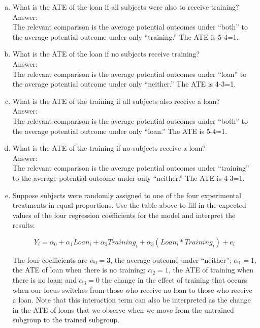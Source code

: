 \documentclass[11pt,notitlepage]{article}\usepackage[]{graphicx}\usepackage[]{color}
\begin{document}
\begin{enumerate}[a)]
\item What is the ATE of the loan if all subjects were also to receive training?\\
Answer:\\
The relevant comparison is the average potential outcomes under ``both'' to the average potential outcome under only ``training.''  The ATE is 5-4=1.

\item What is the ATE of the loan if no subjects receive training?\\
Answer:\\
The relevant comparison is the average potential outcomes under ``loan'' to the average potential outcome under only ``neither.''  The ATE is 4-3=1.

\item What is the ATE of the training if all subjects also receive a loan?\\
Answer:\\
The relevant comparison is the average potential outcomes under ``both'' to the average potential outcome under only ``loan.''  The ATE is 5-4=1.

\item What is the ATE of the training if no subjects receive a loan?\\
Answer:\\
The relevant comparison is the average potential outcomes under ``training'' to the average potential outcome under only ``neither.''  The ATE is 4-3=1.

\item Suppose subjects were randomly assigned to one of the four experimental treatments in equal proportions. Use the table above to fill in the expected values of the four regression coefficients for the model and interpret the results:

\begin{equation}
Y_i = \alpha_0 + \alpha_1 Loan_i + \alpha_2 Training_i + \alpha_3 (Loan_i * Training_i) + e_i
\end{equation}

The four coefficients are $\alpha_0=3$, the average outcome under ``neither''; $\alpha_1=1$, the ATE of loan when there is no training; $\alpha_2=1$, the ATE of training when there is no loan; and $\alpha_3=0$ the change in the effect of training that occurs when our focus switches from those who receive no loan to those who receive a loan.  Note that this interaction term can also be interpreted as the change in the ATE of loans that we observe when we move from the untrained subgroup to the trained subgroup. 


\end{enumerate}
\end{document}
